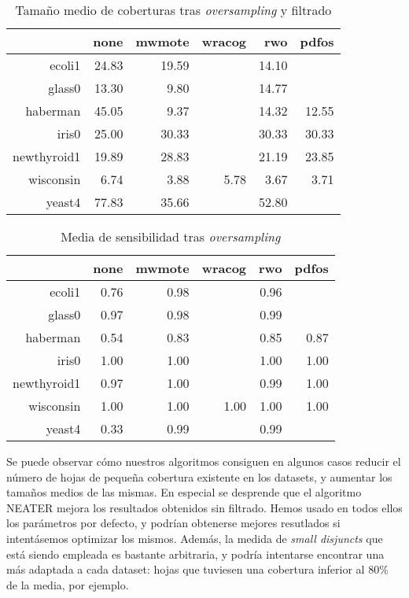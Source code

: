   \begin{table}[H]
  \centering
  \begin{tabular}{rrrrrr}
   \hline
   & none & mwmote & wracog & rwo & pdfos \\ 
   \hline
  ecoli1 & 24.83 & 19.59 &  & 14.10 &  \\ 
  glass0 & 13.30 & 9.80 &  & 14.77 &  \\ 
  haberman & 45.05 & 9.37 &  & 14.32 & 12.55 \\ 
  iris0 & 25.00 & 30.33 &  & 30.33 & 30.33 \\ 
  newthyroid1 & 19.89 & 28.83 &  & 21.19 & 23.85 \\ 
  wisconsin & 6.74 & 3.88 & 5.78 & 3.67 & 3.71 \\ 
  yeast4 & 77.83 & 35.66 &  & 52.80 &  \\ 
   \hline
  \end{tabular}
  \caption{Tamaño medio de coberturas tras \textit{oversampling} y filtrado}
  \end{table}
  
  \begin{table}[H]
  \centering
  \begin{tabular}{rrrrrr}
  \hline
  & none & mwmote & wracog & rwo & pdfos \\ 
  \hline
  ecoli1 & 0.76 & 0.98 &  & 0.96 &  \\ 
  glass0 & 0.97 & 0.98 &  & 0.99 &  \\ 
  haberman & 0.54 & 0.83 &  & 0.85 & 0.87 \\ 
  iris0 & 1.00 & 1.00 &  & 1.00 & 1.00 \\ 
  newthyroid1 & 0.97 & 1.00 &  & 0.99 & 1.00 \\ 
  wisconsin & 1.00 & 1.00 & 1.00 & 1.00 & 1.00 \\ 
  yeast4 & 0.33 & 0.99 &  & 0.99 &  \\ 
  \hline
  \end{tabular}
  \caption{Media de sensibilidad tras \textit{oversampling}}
  \end{table}
  
  Se puede observar cómo nuestros algoritmos consiguen en algunos casos reducir el número de hojas de pequeña 
  cobertura existente en los datasets, y aumentar los tamaños medios de las mismas. En especial se desprende que el algoritmo
  NEATER mejora los resultados obtenidos sin filtrado. Hemos usado en todos ellos los parámetros por defecto, y podrían 
  obtenerse mejores resutlados si intentásemos optimizar los mismos. Además, la medida de \textit{small disjuncts} que está
  siendo empleada es bastante arbitraria, y podría intentarse encontrar una más adaptada a cada dataset: hojas que tuviesen
  una cobertura inferior al 80\% de la media, por ejemplo. 
  
